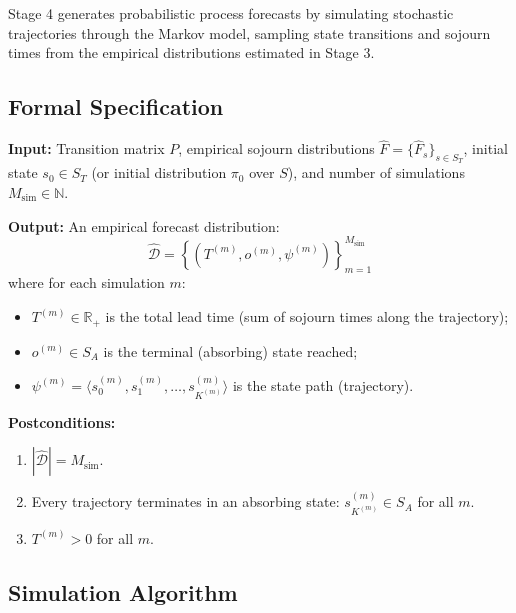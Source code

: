 Stage 4 generates probabilistic process forecasts by simulating stochastic 
trajectories through the Markov model, sampling state transitions and 
sojourn times from the empirical distributions estimated in Stage 3.

\subsection{Formal Specification}
\label{sec:s4-formal}

\begin{definition}
\label{def:contract-s4}
\textbf{Input:} Transition matrix $P$, empirical sojourn distributions 
$\hat{F} = \{\hat{F}_s\}_{s \in S_T}$, initial state $s_0 \in S_T$ 
(or initial distribution $\pi_0$ over $S$), and number of simulations 
$M_{\text{sim}} \in \mathbb{N}$.

\textbf{Output:} An empirical forecast distribution:
\begin{equation}
\label{eq:forecast-distribution}
\hat{\mathcal{D}} = \left\{ \left( T^{(m)}, o^{(m)}, \psi^{(m)} \right) 
    \right\}_{m=1}^{M_{\text{sim}}}
\end{equation}
where for each simulation $m$:
\begin{itemize}
    \item $T^{(m)} \in \mathbb{R}_+$ is the total lead time (sum of 
    sojourn times along the trajectory);
    \item $o^{(m)} \in S_A$ is the terminal (absorbing) state reached;
    \item $\psi^{(m)} = \langle s_0^{(m)}, s_1^{(m)}, \ldots, 
    s_{K^{(m)}}^{(m)} \rangle$ is the state path (trajectory).
\end{itemize}

\textbf{Postconditions:}
\begin{enumerate}
    \item $|\hat{\mathcal{D}}| = M_{\text{sim}}$.
    \item Every trajectory terminates in an absorbing state: 
    $s_{K^{(m)}}^{(m)} \in S_A$ for all $m$.
    \item $T^{(m)} > 0$ for all $m$.
\end{enumerate}
\end{definition}


\subsection{Simulation Algorithm}
\label{sec:s4-algorithm}

